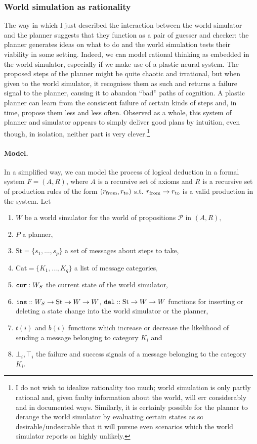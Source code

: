 \subsubsection{World simulation as rationality}
The way in which I just described the interaction between the world simulator and the planner suggests that they function as a pair of guesser and checker: the planner generates ideas on what to do and the world simulation tests their viability in some setting. Indeed, we can model rational thinking as embedded in the world simulator, especially if we make use of a plastic neural system. The proposed steps of the planner might be quite chaotic and irrational, but when given to the world simulator, it recognises them as such and returns a failure signal to the planner, causing it to abandon ``bad'' paths of cognition. A plastic planner can learn from the consistent failure of certain kinds of steps and, in time, propose them less and less often. Observed as a whole, this system of planner and simulator appears to simply deliver good plans by intuition, even though, in isolation, neither part is very clever.\footnote{I do not wish to idealize rationality too much; world simulation is only partly rational and, given faulty information about the world, will err considerably and in documented ways. Similarly, it is certainly possible for the planner to derange the world simulator by evaluating certain states as so desirable/undesirable that it will pursue even scenarios which the world simulator reports as highly unlikely.}

\paragraph{Model.} In a simplified way, we can model the process of logical deduction in a formal system $F = (A, R)$, where $A$ is a recursive set of axioms and $R$ is a recursive set of production rules of the form $(r_{\textnormal{from}}, r_{\textnormal{to}})$ s.t. $r_{\textnormal{from}} \rightarrow r_{\textnormal{to}}$ is a valid production in the system. Let
	\begin{enumerate}
		\item $W$ be a world simulator for the world of propositions $\mathcal{P}$ in $(A,R)$,
		\item $P$ a planner,
		\item $\mathrm{St} = \{s_1,\dots,s_p\}$ a set of messages about steps to take,
		\item $\mathrm{Cat} = \{K_1,\dots,K_q\}$ a list of message categories,
		\item $\mathtt{cur} : W_S$ the current state of the world simulator,
		\item $\mathtt{ins} :: W_S \rightarrow \mathrm{St} \rightarrow W \rightarrow W$, $\mathtt{del} :: \mathrm{St} \rightarrow W \rightarrow W$ functions for inserting or deleting a state change into the world simulator or the planner,
		\item $t(i)$ and $b(i)$ functions which increase or decrease the likelihood of sending a message belonging to category $K_i$ and 
		\item $\bot_{i}, \top_{i}$ the failure and success signals of a message belonging to the category $K_i$.
	\end{enumerate}
	
